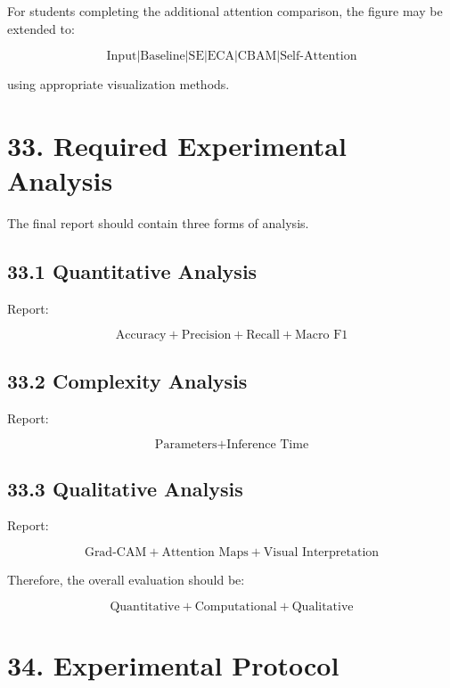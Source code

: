 \documentclass[10pt]{article}
\begin{document}
For students completing the additional attention comparison, the figure may
be extended to:

\[
\boxed{
\text{Input}
|
\text{Baseline}
|
\text{SE}
|
\text{ECA}
|
\text{CBAM}
|
\text{Self-Attention}
}
\]

using appropriate visualization methods.

\section*{33. Required Experimental Analysis}

The final report should contain three forms of analysis.

\subsection*{33.1 Quantitative Analysis}

Report:

\[
\boxed{
\text{Accuracy}
+
\text{Precision}
+
\text{Recall}
+
\text{Macro F1}
}
\]

\subsection*{33.2 Complexity Analysis}

Report:

\[
\boxed{
\text{Parameters}
+
\text{Inference Time}
}
\]

\subsection*{33.3 Qualitative Analysis}

Report:

\[
\boxed{
\text{Grad-CAM}
+
\text{Attention Maps}
+
\text{Visual Interpretation}
}
\]

Therefore, the overall evaluation should be:

\[
\boxed{
\text{Quantitative}
+
\text{Computational}
+
\text{Qualitative}
}
\]

\section*{34. Experimental Protocol}
\end{document}
